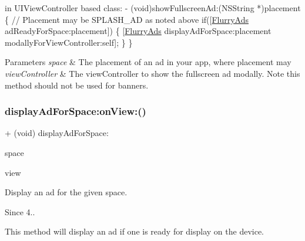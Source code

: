 \begin{DoxyCode}
  in UIViewController based \textcolor{keyword}{class}:
   - (void)showFullscreenAd:(NSString *)placement 
\{
\textcolor{comment}{// Placement may be SPLASH\_AD as noted above}
\textcolor{keywordflow}{if}([\hyperlink{interfaceFlurryAds}{FlurryAds} adReadyForSpace:placement])
\{
   [\hyperlink{interfaceFlurryAds}{FlurryAds} displayAdForSpace:placement modallyForViewController:\textcolor{keyword}{self}];
\}
\}
\end{DoxyCode}



\begin{DoxyParams}{Parameters}
{\em space} & The placement of an ad in your app, where placement may \\
\hline
{\em view\+Controller} & The view\+Controller to show the fullscreen ad modally. Note this method should not be used for banners. \\
\hline
\end{DoxyParams}
\mbox{\label{interfaceFlurryAds_a3a0f6e50b29081bbe13a9856cc5e4844}} 
\subsubsection{\texorpdfstring{display\+Ad\+For\+Space\+:on\+View\+:()}{displayAdForSpace:onView:()}}
{\footnotesize\ttfamily + (void) display\+Ad\+For\+Space\+: \begin{DoxyParamCaption}\item[{(N\+S\+String $\ast$)}]{space }\item[{onView:(U\+I\+View $\ast$)}]{view }\end{DoxyParamCaption}}



Display an ad for the given {\ttfamily space}. 

\begin{DoxySince}{Since}
4..
\end{DoxySince}
This method will display an ad if one is ready for display on the device.

